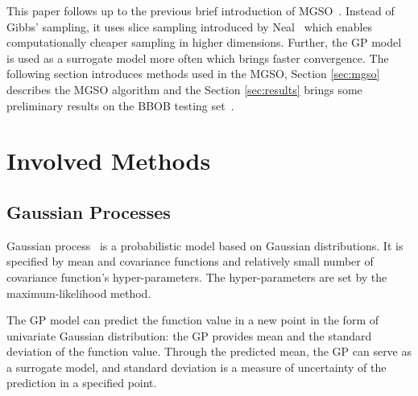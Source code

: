 \documentclass{itatnew}
\begin{document}
This paper follows up to the previous brief introduction of MGSO~\cite{bajer_model_2013}. Instead of Gibbs' sampling, it uses slice sampling introduced by Neal~\cite{neal_slice_2003} which enables computationally cheaper sampling in higher dimensions. Further, the GP model is used as a surrogate model more often which brings faster convergence. The following section introduces methods used in the MGSO, Section \ref{sec:mgso} describes the MGSO algorithm and the Section \ref{sec:results} brings some preliminary results on the BBOB testing set~\cite{hansen_real_2009}.


\section{Involved Methods}

\subsection{Gaussian Processes}

Gaussian process~\cite{rasmussen_gaussian_2006} is a probabilistic model based on Gaussian distributions. 
It is specified by mean and covariance functions and relatively small number of covariance function's hyper-parameters. 
The hyper-parameters are set by the maximum-likelihood method.

The GP model can predict the function value in a new point in the form of univariate Gaussian distribution: the GP provides mean and the standard deviation of the function value. Through the predicted mean, the GP can serve as a surrogate model, and standard deviation is a measure of uncertainty of the prediction in a specified point.
\end{document}
